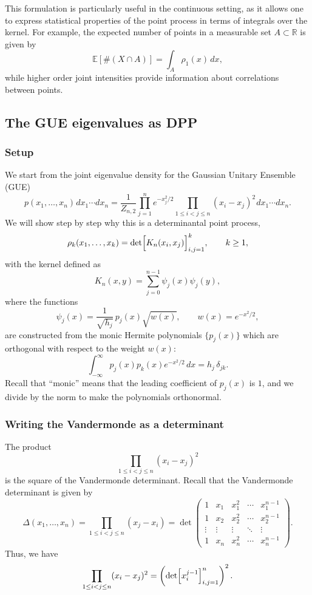 \documentclass[letterpaper,11pt,oneside,reqno]{article}
\numberwithin{equation}{section}
\newcommand{\ssp}{\hspace{1pt}}
\theoremstyle{definition}
\begin{document}
This formulation is particularly useful in the continuous setting, as it allows one to express statistical properties of the point process in terms of integrals over the kernel. For example, the expected number of points in a measurable set $A\subset \mathbb{R}$ is given by
\[
\mathbb{E}[\#(X\cap A)]=\int_A \rho_1(x)\,dx,
\]
while higher order joint intensities provide information about correlations between points.

\subsection{The GUE eigenvalues as DPP}

\subsubsection{Setup}

We start from the joint eigenvalue density for the Gaussian Unitary Ensemble (GUE)
\begin{equation}
\label{eq:gue-joint-density}
p(x_1,\dots,x_n)
\ssp dx_1\cdots dx_n
=\frac{1}{Z_{n,2}}\prod_{j=1}^n e^{-x_j^2/2}\prod_{1\le i<j\le n} (x_i-x_j)^2
\ssp dx_1\cdots dx_n.
\end{equation}
We will show step by step why this is a determinantal point process,
\[
	\rho_k(x_1,\dots,x_k)=\det\Bigl[K_n(x_i,x_j)\Bigr]_{i,j=1}^k, \qquad k\ge1,
\]
with the kernel defined as
\[
K_n(x,y)=\sum_{j=0}^{n-1}\psi_j(x)\psi_j(y),
\]
where the functions
\[
\psi_j(x)=\frac{1}{\sqrt{h_j}}\,p_j(x)\sqrt{w(x)},\qquad w(x)=e^{-x^2/2},
\]
are constructed from the monic Hermite polynomials $\{p_j(x)\}$ which are orthogonal with respect to the weight $w(x)$:
\[
\int_{-\infty}^\infty p_j(x)p_k(x)e^{-x^2/2}\,dx = h_j\,\delta_{jk}.
\]
Recall that ``monic'' means that the leading coefficient of $p_j(x)$ is $1$,
and we divide by the norm to make the polynomials orthonormal.

\subsubsection{Writing the Vandermonde as a determinant}
The product
\[
\prod_{1\le i<j\le n} (x_i-x_j)^2
\]
is the square of the Vandermonde determinant. Recall that the Vandermonde determinant is given by
\[
\Delta(x_1,\dots,x_n) = \prod_{1\le i<j\le n} (x_j-x_i) = \det\begin{pmatrix}
1 & x_1 & x_1^2 & \cdots & x_1^{n-1}\\[1mm]
1 & x_2 & x_2^2 & \cdots & x_2^{n-1}\\[1mm]
\vdots & \vdots & \vdots & \ddots & \vdots\\[1mm]
1 & x_n & x_n^2 & \cdots & x_n^{n-1}
\end{pmatrix}.
\]
Thus, we have
\[
\prod_{1\le i<j\le n} (x_i-x_j)^2 = \left(\det\Bigl[x_i^{j-1}\Bigr]_{i,j=1}^n\right)^2.
\]
\end{document}
